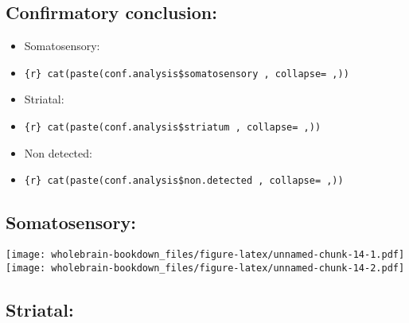 \documentclass[]{book}
\newenvironment{Shaded}{\begin{snugshade}}{\end{snugshade}}
\newcommand{\KeywordTok}[1]{\textcolor[rgb]{0.13,0.29,0.53}{\textbf{{#1}}}}
\newcommand{\DataTypeTok}[1]{\textcolor[rgb]{0.13,0.29,0.53}{{#1}}}
\newcommand{\DecValTok}[1]{\textcolor[rgb]{0.00,0.00,0.81}{{#1}}}
\newcommand{\NormalTok}[1]{{#1}}
\providecommand{\tightlist}{%
  \setlength{\itemsep}{0pt}\setlength{\parskip}{0pt}}
\theoremstyle{definition}
\theoremstyle{definition}
\theoremstyle{remark}
\begin{document}
\subsection{Confirmatory conclusion:}\label{confirmatory-conclusion}

\begin{itemize}
\tightlist
\item
  Somatosensory:
\item
  \texttt{\{r\}\ cat(paste(conf.analysis\$somatosensory\ ,\ collapse=\textquotesingle{}\ ,\textquotesingle{}))}
\item
  Striatal:
\item
  \texttt{\{r\}\ cat(paste(conf.analysis\$striatum\ ,\ collapse=\textquotesingle{}\ ,\textquotesingle{}))}
\item
  Non detected:
\item
  \texttt{\{r\}\ cat(paste(conf.analysis\$non.detected\ ,\ collapse=\textquotesingle{}\ ,\textquotesingle{}))}
\end{itemize}

\subsection{Somatosensory:}\label{somatosensory}

\begin{Shaded}
\end{Shaded}

\texttt{[image: wholebrain-bookdown\_files/figure-latex/unnamed-chunk-14-1.pdf]}
\texttt{[image: wholebrain-bookdown\_files/figure-latex/unnamed-chunk-14-2.pdf]}

\subsection{Striatal:}\label{striatal}
\end{document}
